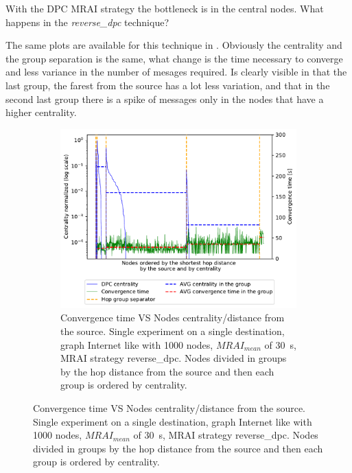 \documentclass[10pt,conference,letterpaper]{IEEEtran}
\newcommand{\figwidth}{0.78}
\begin{document}
With the \ac{DPC} \ac{MRAI} strategy the bottleneck is in the central nodes.
What happens in the \textit{reverse\_dpc} technique?

The same plots are available for this technique in .
Obviously the centrality and the group separation is the same, what change is the
time necessary to converge and less variance in the number of mesages required.
Is clearly visible in  that
the last group, the farest from the source has a lot less variation, and that
in the second last group there is a spike of messages only in the nodes that
have a higher centrality.

\begin{figure}[tb]
	\centering

	\begin{subfigure}{\columnwidth}
		\centering
		\includegraphics[width=\figwidth\columnwidth]{images/different_destinations/1000-reverse_dpc-d0_node-conv_MRAI30_centVStime.pdf}
		\caption{Convergence time VS Nodes centrality/distance from the source.
				 Single experiment on a single destination, graph Internet like with \num{1000} nodes, $MRAI_{mean}$ of \SI{30}{\second},
				 \ac{MRAI} strategy reverse\_dpc. Nodes divided in groups by the hop distance from the source and then each group is
				 ordered by centrality.}
		\label{fig:1000-reverse-dpc_node_conv_centVStime_all}
		\qquad
	\end{subfigure}


\end{figure}
\end{document}
